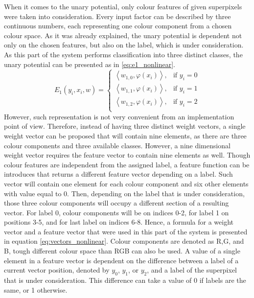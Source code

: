 When it comes to the unary potential, only colour features of given superpixels were taken into consideration. Every  input factor can be described by three continuous numbers, each representing one colour component from a chosen colour space. As it was already explained, the unary potential is dependent not only on the chosen features, but also on the label, which is under consideration. As this part of the system performs classification into three distinct classes, the unary potential can be presented as in \ref{eq:e1_nonlinear}. 
\begin{equation}
    \label{eq:e1_nonlinear}
    E_1(y_i,x_i,w)= 
    \begin{cases}
        \left \langle w_{1,0}, \varphi({x_i}) \right \rangle , &  \text{if } y_i = 0\\ 
        \left \langle w_{1,1}, \varphi({x_i}) \right \rangle , & \text{if } y_i = 1\\
        \left \langle w_{1,2}, \varphi({x_i}) \right \rangle , & \text{if } y_i = 2\\  
    \end{cases}
\end{equation}
However, such representation is not very convenient from an implementation point of view. Therefore, instead of having three distinct weight vectors, a single weight vector can be proposed that will contain nine elements, as there are three colour components and three available classes. However, a nine dimensional weight vector requires the feature vector to contain nine elements as well. Though colour features are independent from the assigned label, a feature function can be introduces that returns a different feature vector depending on a label. Such vector will contain one element for each colour component and six other elements with value equal to 0. Then, depending on the label that is under consideration, those three colour components will occupy a different section of a resulting vector. For label 0, colour components will be on indices 0-2, for label 1 on positions 3-5, and for last label on indices 6-8. Hence, a formula for a weight vector and a feature vector that were used in this part of the system is presented in equation \ref{eq:vectors_nonlinear}. Colour components are denoted as R,G, and B, tough different colour space than RGB can also be used. A value of a single element in a feature vector is dependent on the difference between a label of a current vector position, denoted by $y_0$, $y_1$, or $y_2$, and a label of the superpixel that is under consideration. This difference can take a value of 0 if labels are the same, or 1 otherwise.
